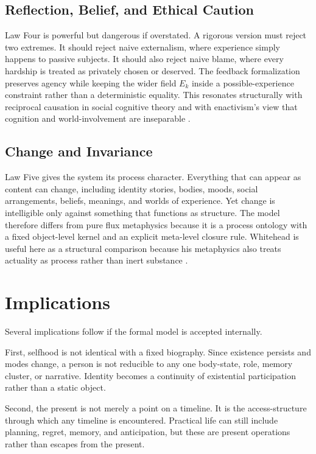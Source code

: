 \documentclass[11pt]{article}
\begin{document}
\subsection{Reflection, Belief, and Ethical Caution}

Law Four is powerful but dangerous if overstated.  A rigorous version must reject two extremes.  It should reject naive externalism, where experience simply happens to passive subjects.  It should also reject naive blame, where every hardship is treated as privately chosen or deserved.  The feedback formalization preserves agency while keeping the wider field $E_k$ inside a possible-experience constraint rather than a deterministic equality.  This resonates structurally with reciprocal causation in social cognitive theory and with enactivism's view that cognition and world-involvement are inseparable \cite{Bandura1986,Varela1991}.

\subsection{Change and Invariance}

Law Five gives the system its process character.  Everything that can appear as content can change, including identity stories, bodies, moods, social arrangements, beliefs, meanings, and worlds of experience.  Yet change is intelligible only against something that functions as structure.  The model therefore differs from pure flux metaphysics because it is a process ontology with a fixed object-level kernel and an explicit meta-level closure rule.  Whitehead is useful here as a structural comparison because his metaphysics also treats actuality as process rather than inert substance \cite{Whitehead1978}.

\section{Implications}

Several implications follow if the formal model is accepted internally.

First, selfhood is not identical with a fixed biography.  Since existence persists and modes change, a person is not reducible to any one body-state, role, memory cluster, or narrative.  Identity becomes a continuity of existential participation rather than a static object.

Second, the present is not merely a point on a timeline.  It is the access-structure through which any timeline is encountered.  Practical life can still include planning, regret, memory, and anticipation, but these are present operations rather than escapes from the present.
\end{document}
